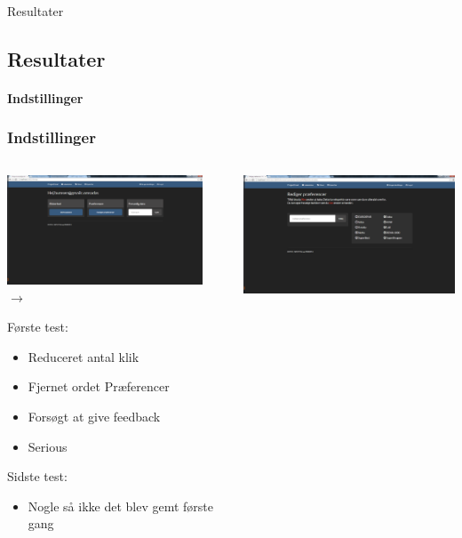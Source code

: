 \begin{frame}{Resultater}
\subsection{Resultater}
\framesubtitle{Indstillinger}
	\subsubsection{Indstillinger}
	
	\begin{minipage}[0.3\textheight]{\textwidth}
	\begin{columns}[T]
	\begin{column}{0.5\textwidth}
	 \includegraphics[width=0.9\textwidth,height=0.9\textheight,keepaspectratio, trim={1cm 0 0 16mm}, clip]{images/Screenshots/SettingsOld.png} \vspace{2 mm} $\rightarrow$ 
	 
	 Første test:
	 \begin{itemize}
	 	\item Reduceret antal klik
	 	\item Fjernet ordet Præferencer
	 	\item Forsøgt at give feedback
	 	\item Serious
	 \end{itemize}
	 Sidste test:
	 \begin{itemize}
	 	\item Nogle så ikke det blev gemt første gang
	 \end{itemize}
	 
	\end{column}
	\begin{column}{0.5\textwidth}
	 \includegraphics[width=1\textwidth,height=1\textheight,keepaspectratio, trim={1cm 0 0 16mm}, clip]{images/Screenshots/SettingsOld2.png}
	 

\end{column}
\end{columns}
\end{minipage}
\end{frame}
